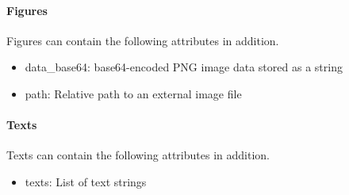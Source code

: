 \paragraph{Figures} Figures can contain the following attributes in addition.

\begin{itemize}  
  \item data\_base64: base64-encoded PNG image data stored as a string
  \item path: Relative path to an external image file
\end{itemize}

\paragraph{Texts} Texts can contain the following attributes in addition.

\begin{itemize}  
  \item texts: List of text strings
\end{itemize}
